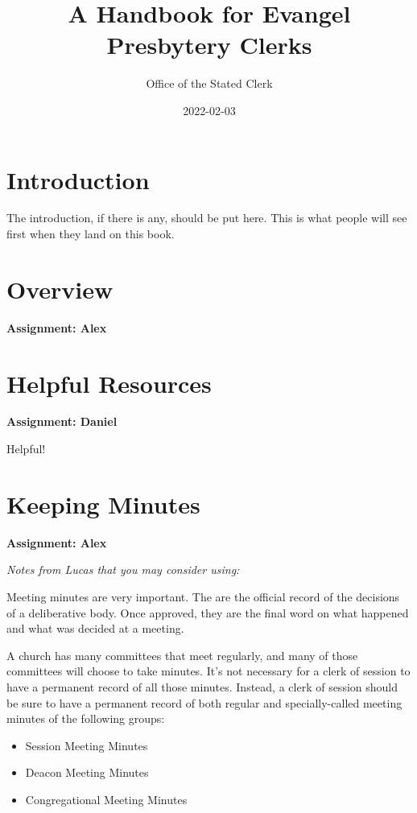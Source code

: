 \documentclass[
]{book}
\title{A Handbook for Evangel Presbytery Clerks}
\author{Office of the Stated Clerk}
\date{2022-02-03}
\providecommand{\tightlist}{%
  \setlength{\itemsep}{0pt}\setlength{\parskip}{0pt}}
\begin{document}
\maketitle

{
\setcounter{tocdepth}{1}
\tableofcontents
}
\hypertarget{introduction}{%
\chapter{Introduction}\label{introduction}}

The introduction, if there is any, should be put here. This is what people will see first when they land on this book.

\hypertarget{overview}{%
\chapter{Overview}\label{overview}}

\textbf{Assignment: Alex}

\hypertarget{helpful-resources}{%
\chapter{Helpful Resources}\label{helpful-resources}}

\textbf{Assignment: Daniel}

Helpful!

\hypertarget{keeping-minutes}{%
\chapter{Keeping Minutes}\label{keeping-minutes}}

\textbf{Assignment: Alex}

\emph{Notes from Lucas that you may consider using:}

Meeting minutes are very important. The are the official record of the decisions of a deliberative body. Once approved, they are the final word on what happened and what was decided at a meeting.

A church has many committees that meet regularly, and many of those committees will choose to take minutes. It's not necessary for a clerk of session to have a permanent record of all those minutes. Instead, a clerk of session should be sure to have a permanent record of both regular and specially-called meeting minutes of the following groups:

\begin{itemize}
\tightlist
\item
  Session Meeting Minutes
\item
  Deacon Meeting Minutes
\item
  Congregational Meeting Minutes
\end{itemize}
\end{document}
